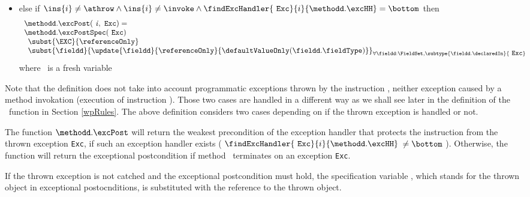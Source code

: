 \begin{defExc}
\begin{itemize}
    \item else if $\ins{i} \neq \athrow \wedge \ins{i} \neq \invoke \wedge   \findExcHandler{ \mbox{ \rm \texttt{Exc}}   }{i}{\methodd.\excHH} = \bottom $ then 
            $$\begin{array}{l}
                    \methodd.\excPost( \mbox{ \rm \textit{i}} ,  \mbox{ \rm \texttt{Exc}}) = \\
                        \methodd.\excPostSpec( \mbox{ \rm \texttt{Exc}}  ) \\
                     \begin{array}{l}
		           \subst{ \EXC }{\referenceOnly  }\\
                          \subst{ \fieldd}{ \update{\fieldd } { \referenceOnly }{\defaultValueOnly( \fieldd.\fieldType ) } }_{ {\small \forall \fieldd: \FieldSet, 
			   \subtype{\fieldd.\declaredIn}{ \mbox{ \rm \texttt{Exc}}} } }    \\
                    \end{array}  
             \end{array} $$
	where  \ is a fresh variable
    




\end{itemize}
\end{defExc}
Note that the definition does not take into account programmatic exceptions thrown by the instruction \athrow, neither exception caused by a method invokation
(execution of instruction \invoke). Those two cases are handled in a different way as we shall see later in the definition of the \fwpi \ function in Section
\ref{wpRules}.
The above definition considers two cases depending on if  the thrown exception   is handled or not.

The function $\methodd.\excPost$ will return the weakest precondition of the exception handler that protects the instruction from the thrown exception \texttt{Exc},
if such an exception handler exists ( $  \findExcHandler{\mbox{ \rm \texttt{Exc}} }{i}{\methodd.\excHH} $ $ \neq \bottom $ ). 
Otherwise, the function will return the exceptional postcondition if method \methodd \ terminates on
an exception  \texttt{Exc}.
  
 If the thrown exception is not catched  and the exceptional postcondition must hold, the specification variable \EXC, which stands for the thrown object in exceptional 
postocnditions, is substituted with the reference to the thrown object.


